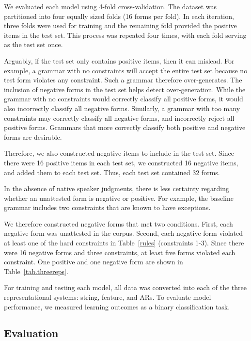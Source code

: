 We evaluated each model using 4-fold cross-validation. 
The dataset was partitioned into four equally sized 
folds (16 forms per fold).
In each iteration, three folds were used for training
and the remaining fold provided the positive items in 
the test set. This process was repeated four times, with 
each fold serving as the test set once.

Arguably, if the test set only contains positive items, then it can mislead.
For example, a grammar with no constraints will accept the entire test set
because no test form violates any constraint.
Such a grammar therefore over-generates.
The inclusion of negative forms in the test set helps detect over-generation.
While the grammar with no constraints would correctly classify all positive
forms, it would also incorrectly classify all negative forms.
Similarly, a grammar with too many constraints may correctly classify all
negative forms,
and incorrectly reject all positive forms.
Grammars that more correctly classify both positive and negative forms are
desirable.

Therefore, we also constructed negative items to include in the test set.
Since there were 16 positive items in each test set,
we constructed 16 negative items, and added them to each test set.
Thus, each test set contained 32 forms.

In the absence of native speaker judgments,
there is less certainty regarding whether an unattested form is negative or
positive.
For example, the baseline grammar includes two constraints that are known to
have exceptions.

We therefore constructed negative forms that met two conditions.
First, each negative form was unattested in the corpus.
Second, each negative form violated at least one of the
hard constraints in Table~\ref{rules} (constraints 1-3).
Since there were 16 negative forms and three constraints,
at least five forms violated each constraint.
One positive and one negative form are shown in Table~\ref{tab.threereps}.
% 

For training and testing each model, all data was converted into
each of the three representational systems: string, feature, and ARs.
To evaluate model performance, we measured learning outcomes
as a binary classification task.

\subsection{Evaluation}

